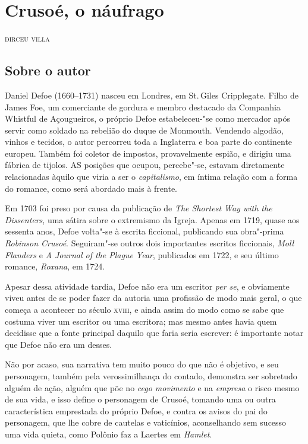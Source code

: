 \chapter{Crusoé, o náufrago}

\begin{flushright}
\textsc{dirceu villa}\bigskip
\end{flushright}

\section{Sobre o autor}

\noindent{}Daniel Defoe (1660--1731) nasceu em Londres, em St.\,Giles Cripplegate. Filho de James Foe, um comerciante de gordura e membro destacado da Companhia Whistful de Açougueiros, o próprio Defoe estabeleceu-"se como mercador após servir como soldado na rebelião do duque de Monmouth. Vendendo algodão, vinhos e tecidos, o autor percorreu toda a Inglaterra e boa parte do continente europeu. Também foi coletor de impostos, provavelmente espião, e dirigiu uma fábrica de tijolos.
AS posições que ocupou, percebe"-se, estavam diretamente relacionadas àquilo que viria a ser o \emph{capitalismo}, em íntima relação com a forma do romance, como será abordado mais à frente.

Em 1703 foi preso por causa da publicação de \textit{The Shortest Way with the Dissenters}, uma sátira sobre o extremismo da Igreja. Apenas em 1719, quase aos sessenta anos, Defoe volta"-se à escrita ficcional, publicando sua obra"-prima \textit{Robinson Crusoé}. Seguiram"-se outros dois importantes escritos ficcionais, \textit{Moll Flanders} e \textit{A Journal of the Plague Year}, publicados em 1722, e seu último romance, \textit{Roxana},  em 1724. 

Apesar dessa atividade tardia, Defoe não era um escritor \emph{per se}, e obviamente viveu antes de se
poder fazer da autoria uma profissão de modo mais geral, o que começa a
acontecer no século \textsc{xviii}, e ainda assim do modo como se sabe que
costuma viver um escritor ou uma escritora; mas mesmo antes havia quem
decidisse que a fonte principal daquilo que faria seria escrever: é
importante notar que Defoe não era um desses.

Não por acaso, sua narrativa tem muito pouco do que não é objetivo, e
seu personagem, também pela verossimilhança do contado, demonstra ser
sobretudo alguém de ação, alguém que põe no \emph{cego movimento} e na
\emph{empresa} o risco mesmo de sua vida, e isso define o personagem de
Crusoé, tomando uma ou outra característica emprestada do próprio Defoe,
e contra os avisos do pai do personagem, que lhe cobre de cautelas e
vaticínios, aconselhando sem sucesso uma vida quieta, como Polônio faz a
Laertes em \emph{Hamlet}.

